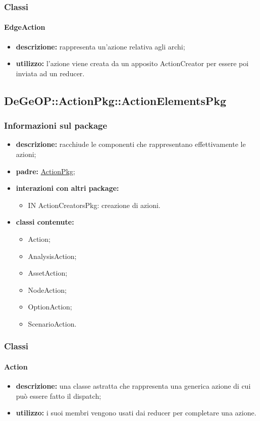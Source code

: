 \subsubsection{Classi}
\paragraph{EdgeAction}
\begin{itemize}
	\item \textbf{descrizione:} rappresenta un'azione relativa agli archi;
	\item \textbf{utilizzo:} l'azione viene creata da un apposito ActionCreator per essere poi inviata ad un reducer.
\end{itemize}
\newpage
\subsection{DeGeOP::ActionPkg::ActionElementsPkg}
\label{pkg::ActionElementsPkg}
\subsubsection{Informazioni sul package}
\begin{itemize}
	\item \textbf{descrizione:} racchiude le componenti che rappresentano effettivamente le azioni;
	\item \textbf{padre:} \hyperref[pkg::ActionPkg]{ActionPkg};
	\item \textbf{interazioni con altri package:} 
	\begin{itemize}
		\item IN ActionCreatorsPkg: creazione di azioni.
	\end{itemize}
	\item \textbf{classi contenute:}
	\begin{itemize}
		\item Action;
		\item AnalysisAction;
		\item AssetAction;
		\item NodeAction;
		\item OptionAction;
		\item ScenarioAction.
	\end{itemize}
\end{itemize}
\subsubsection{Classi}
\paragraph{Action}
\begin{itemize}
	\item \textbf{descrizione:} una classe astratta che rappresenta una generica azione di cui può essere fatto il dispatch;
	\item \textbf{utilizzo:} i suoi membri vengono usati dai reducer per completare una azione.
\end{itemize}

